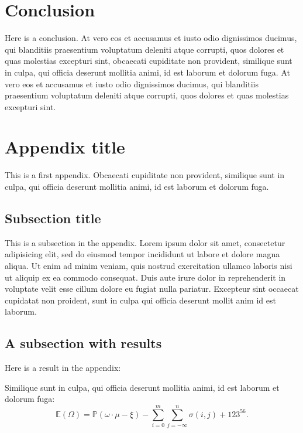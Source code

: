 \documentclass[letterpaper,12pt,leqno]{article}
\newcommand{\bib}{bibliography.bib}
\begin{document}
\section{Conclusion}\label{s:ccl}

Here is a conclusion. At vero eos et accusamus et iusto odio dignissimos ducimus, qui blanditiis praesentium voluptatum deleniti atque corrupti, quos dolores et quas molestias excepturi sint, obcaecati cupiditate non provident, similique sunt in culpa, qui officia deserunt mollitia animi, id est laborum et dolorum fuga. At vero eos et accusamus et iusto odio dignissimos ducimus, qui blanditiis praesentium voluptatum deleniti atque corrupti, quos dolores et quas molestias excepturi sint.



\appendix
\section{Appendix title}\label{a:appendix1}

This is a first appendix. Obcaecati cupiditate non provident, similique sunt in culpa, qui officia deserunt mollitia animi, id est laborum et dolorum fuga. 

\subsection{Subsection title} 

This is a subsection in the appendix. Lorem ipsum dolor sit amet, consectetur adipisicing elit, sed do eiusmod tempor incididunt ut labore et dolore magna aliqua. Ut enim ad minim veniam, quis nostrud exercitation ullamco laboris nisi ut aliquip ex ea commodo
consequat. Duis aute irure dolor in reprehenderit in voluptate velit esse
cillum dolore eu fugiat nulla pariatur. Excepteur sint occaecat cupidatat non
proident, sunt in culpa qui officia deserunt mollit anim id est laborum. 

\subsection{A subsection with results}

Here is a result in the appendix:

\begin{corollary} Similique sunt in culpa, qui officia deserunt mollitia animi, id est laborum et dolorum fuga:
\begin{equation*}
\mathbb{E}(\Omega) = \mathbb{P}(\omega\cdot \mu - \xi) - \sum_{i=0}^{m}\sum_{j=-\infty}^{n} \sigma(i,j) + 123^{56}.
\end{equation*}\end{corollary}
\end{document}
